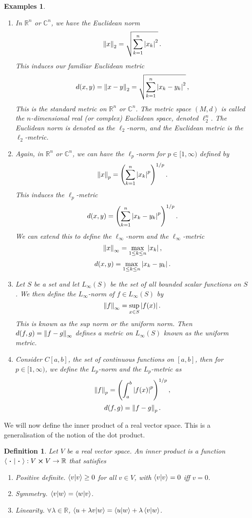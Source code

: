 \documentclass{article}
\theoremstyle{plain}\theoremheaderfont{\normalfont\itshape}\theorembodyfont{\rmfamily}\theoremseparator{.}\newtheorem*{rem}{Remark}\newtheorem*{ex}{Example}\newtheorem*{proof}{Proof}\newtheorem*{altp}{Alternative proof}
\theoremstyle{plain}\theoremheaderfont{\normalfont\bfseries}\theorembodyfont{\rmfamily}\theoremseparator{.}\newtheorem{thm}{Theorem}[section]\newtheorem{lem}[thm]{Lemma}\newtheorem{prop}[thm]{Proposition}\newtheorem*{cor}{Corollary}\newtheorem{defn}[thm]{Definition}\newtheorem{clm}[thm]{Claim}\newtheorem{clminproof}{Claim}
\theoremstyle{break}\theoremheaderfont{\normalfont\itshape}\theorembodyfont{\rmfamily}\theoremseparator{.\medskip}\newtheorem*{proofskip}{Proof}\newtheorem*{exs}{Examples}\newtheorem*{rems}{Remarks}
\theoremstyle{break}\theoremheaderfont{\normalfont\bfseries}\theorembodyfont{\rmfamily}\theoremseparator{.\medskip}\newtheorem{lemskip}[thm]{Lemma}\newtheorem{defnskip}[thm]{Definition}\newtheorem{propskip}[thm]{Proposition}\newtheorem{thmskip}[thm]{Theorem}
\begin{document}
    \begin{exs}
        \begin{enumerate}[label=(\roman*),topsep=0pt]
            \item In \(\mathbb{R}^n\) or \(\mathbb{C}^n\), we have the \textit{Euclidean norm}
            \[\norm{x}_2=\sqrt{\sum_{k=1}^{n}\abs{x_k}^2}\,.\]
            This induces our familiar Euclidean metric
            \[d(x,y)=\norm{x-y}_2=\sqrt{\sum_{k=1}^{n}\abs{x_k-y_k}^2}\,,\]
            This is the standard metric on \(\mathbb{R}^n\) or \(\mathbb{C}^n\). The metric space \((M,d)\) is called the \(n\)-dimensional real (or complex) \textit{Euclidean space}, denoted \(\ell_2^n\). The Euclidean norm is denoted as the \(\ell_2\)-norm, and the Euclidean metric is the \(\ell_2\)-metric.
            \item Again, in \(\mathbb{R}^n\) or \(\mathbb{C}^n\), we can have the \textit{\(\ell_p\)-norm} for \(p\in[1,\infty)\) defined by
            \[\norm{x}_p=\qty(\sum_{k=1}^{n}\abs{x_k}^p)^{1/p}\,.\]
            This induces the \textit{\(\ell_p\)-metric}
            \[d(x,y)=\qty(\sum_{k=1}^{n}\abs{x_k-y_k}^p)^{1/p}\,.\]
            We can extend this to define the \textit{\(\ell_\infty\)-norm} and the \textit{\(\ell_\infty\)-metric}
            \[\norm{x}_{\infty}=\max_{1\le k\le n}\abs{x_k}\,,\]
            \[d(x,y)=\max_{1\le k\le n}\abs{x_k-y_k}\,.\]
            \item Let \(S\) be a set and let \(L_\infty(S)\) be the set of all bounded scalar functions on \(S\). We then define the \textit{\(L_\infty\)-norm} of \(f\in L_{\infty}(S)\) by
            \[\norm{f}_\infty=\sup_{x\in S}\abs{f(x)}\,.\]
            This is known as the \textit{sup norm} or the \textit{uniform norm}. Then \(d(f,g)=\norm{f-g}_\infty\) defines a metric on \(L_\infty(S)\) known as the \textit{uniform metric}.
            \item Consider \(C[a,b]\), the set of continuous functions on \([a,b]\), then for \(p\in[1,\infty)\), we define the \textit{\(L_p\)-norm} and the \textit{\(L_p\)-metric} as
            \[\norm{f}_p=\qty(\int_{a}^{b}\abs{f(x)}^p)^{1/p}\,,\]
            \[d(f,g)=\norm{f-g}_p\,.\]
        \end{enumerate}
    \end{exs}

    We will now define the inner product of a real vector space. This is a generalisation of the notion of the dot product.
    \begin{defn}
        Let \(V\) be a real vector space. An inner product is a function \(\braket{\ \vdot \ }{\ \vdot\ }:V\cross V\to\mathbb{R}\) that satisfies
        \begin{enumerate}[topsep=0pt]
            \item \textit{Positive definite.} \(\braket{v}\ge 0\) for all \(v\in V\), with \(\braket{v}=0\) iff \(v=0\).
            \item \textit{Symmetry.} \(\braket{v}{w}=\braket{w}{v}\).
            \item \textit{Linearity.} \(\forall\lambda\in\mathbb{R}\), \(\braket{u+\lambda v}{w}=\braket{u}{w}+\lambda\braket{v}{w}\).
        \end{enumerate}
    \end{defn}
\end{document}
